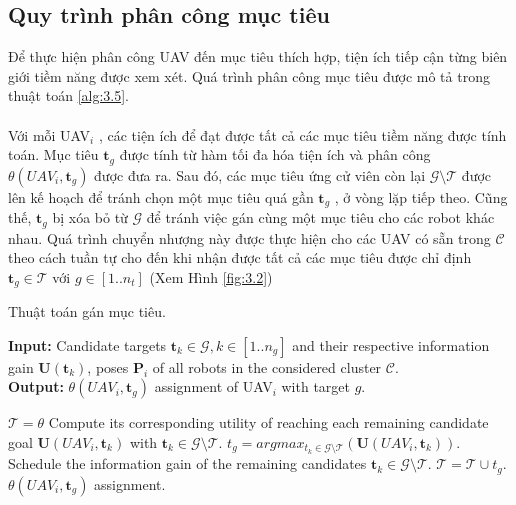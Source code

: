 \documentclass[11pt,openany]{book}
\begin{document}
\subsection{Quy trình phân công mục tiêu}
Để thực hiện phân công UAV đến mục tiêu thích hợp, tiện ích tiếp cận từng biên giới tiềm năng được xem xét. Quá trình phân công mục tiêu được mô tả trong thuật toán \ref{alg:3.5}.\\\\
Với mỗi UAV$_i$ , các tiện ích để đạt được tất cả các mục tiêu tiềm năng được tính toán. Mục tiêu $\mathbf{t}_g$ được tính từ hàm tối đa hóa tiện ích và phân công $\theta(UAV_i,\mathbf{t}_g)$ được đưa ra. Sau đó, các mục tiêu ứng cử viên còn lại $\mathcal{G}\setminus \mathcal{T}$ được lên kế hoạch để tránh chọn một mục tiêu quá gần $\mathbf{t}_g$ , ở vòng lặp tiếp theo. Cũng thế, $\mathbf{t}_g$ bị xóa bỏ từ $\mathcal{G}$ để tránh việc gán cùng một mục tiêu cho các robot khác nhau. Quá trình chuyển nhượng này được thực hiện cho các UAV có sẵn trong $\mathcal{C}$ theo cách tuần tự cho đến khi nhận được tất cả các mục tiêu được chỉ định $\mathbf{t}_g \in \mathcal{T}$ với $g \in [1..n_t]$ (Xem Hình \ref{fig:3.2})
\begin{algorithm}[H]
    \caption{Thuật toán gán mục tiêu.}
    \label{alg:3.5}
    \hspace*{\algorithmicindent} \textbf{Input:} {Candidate targets $\mathbf{t}_k \in \mathcal{G}, k \in [1..n_g]$ and their respective information gain $\mathbf{U}(\mathbf{t}_k)$, poses $\mathbf{P}_i$ of all robots in the considered cluster $\mathcal{C}$.}\\
    \hspace*{\algorithmicindent} \textbf{Output:} {$\theta(UAV_i,\mathbf{t}_g)$ assignment of UAV$_i$ with target $g$.}
    \begin{algorithmic}[1]
        \STATE $\mathcal{T}=\theta$
        \STATE Compute its corresponding utility of reaching each remaining candidate goal $\mathbf{U}(UAV_i,\mathbf{t}_k)$ with $\mathbf{t}_k \in \mathcal{G}\setminus \mathcal{T}$.
        \STATE $t_g=argmax_{t_k \in \mathcal{G}\setminus \mathcal{T}}(\mathbf{U}(UAV_i,\mathbf{t}_k))$.
        \STATE Schedule the information gain of the remaining candidates $\mathbf{t}_k \in \mathcal{G} \setminus \mathcal{T}$.
        \STATE $\mathcal{T}=\mathcal{T}\cup t_g$.
        \ENDWHILE
        \RETURN $\theta(UAV_i, \mathbf{t}_g)$ assignment.
    \end{algorithmic}
\end{algorithm}
\end{document}
